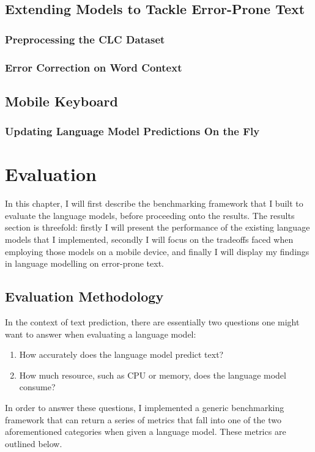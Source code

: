 \documentclass[a4paper, 12pt]{report}
\begin{document}
\section{Extending Models to Tackle Error-Prone Text}
\subsection{Preprocessing the CLC Dataset}
\subsection{Error Correction on Word Context}
\section{Mobile Keyboard}
\subsection{Updating Language Model Predictions On the Fly}

\chapter{Evaluation}

In this chapter, I will first describe the benchmarking framework that I built to evaluate the language models, before proceeding onto the results. The results section is threefold: firstly I will present the performance of the existing language models that I implemented, secondly I will focus on the tradeoffs faced when employing those models on a mobile device, and finally I will display my findings in language modelling on error-prone text.

\section{Evaluation Methodology}

In the context of text prediction, there are essentially two questions one might want to answer when evaluating a language model:
\begin{enumerate}
\item
	How accurately does the language model predict text?
\item
	How much resource, such as CPU or memory, does the language model consume?
\end{enumerate}

In order to answer these questions, I implemented a generic benchmarking framework that can return a series of metrics that fall into one of the two aforementioned categories when given a language model. These metrics are outlined below.
\end{document}
